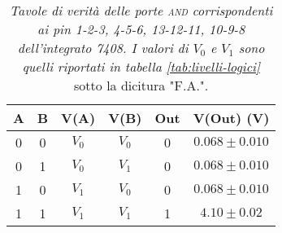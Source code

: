 \begin{table}[H]
  \vspace{.5cm}
  
  \begin{subtable}[H]{0.5\textwidth}
    \centering
    \begin{tabular}[t]{c  c | c  c | c  c}
      \hline
      A & B & V(A) & V(B) & Out & V(Out) (V)\\
      \hline
      0 & 0 & $V_{0}$ & $V_{0}$ & 0 & $0.068 \pm 0.010$ \\
      0 & 1 & $V_{0}$ & $V_{1}$ & 0 & $0.068 \pm 0.010$ \\
      1 & 0 & $V_{1}$ & $V_{0}$ & 0 & $0.068 \pm 0.010$ \\
      1 & 1 & $V_{1}$ & $V_{1}$ & 1 & $4.10 \pm 0.02$ \\
      \hline
    \end{tabular}
  \end{subtable}
  \caption{\emph{Tavole di verità delle porte \textsc{and} corrispondenti ai pin 1-2-3, 4-5-6, 13-12-11, 10-9-8 dell'integrato 7408. I valori di $V_{0}$ e $V_{1}$ sono quelli riportati in tabella \ref{tab:livelli-logici}} sotto la dicitura "F.A.".}
  \label{tab:and2-multiplexer}
\end{table}

